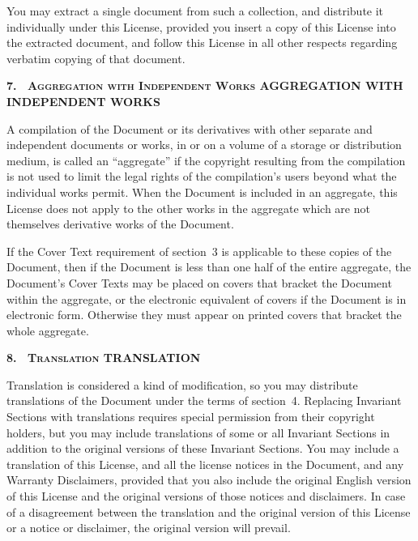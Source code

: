 You may extract a single document from such a collection,
and distribute it individually under this License, provided
you insert a copy of this License into the extracted
document, and follow this License in all other respects
regarding verbatim copying of that document.

\medskip
\begin{center}
  \textbf{%
    \Large
    7.\
    \ifgfdl@sc
      \textsc{Aggregation with Independent Works}%
    \else
      AGGREGATION WITH INDEPENDENT WORKS%
    \fi
  }%
\end{center}

\noindent
A compilation of the Document or its derivatives with other
separate and independent documents or works, in or on a
volume of a storage or distribution medium, is called an
\enquote{aggregate} if the copyright resulting from the
compilation is not used to limit the legal rights of the
compilation's users beyond what the individual works permit.
When the Document is included in an aggregate, this License
does not apply to the other works in the aggregate which are
not themselves derivative works of the Document.

If the Cover Text requirement of section~3 is applicable to
these copies of the Document, then if the Document is less
than one half of the entire aggregate, the Document's Cover
Texts may be placed on covers that bracket the Document
within the aggregate, or the electronic equivalent of covers
if the Document is in electronic form. Otherwise they must
appear on printed covers that bracket the whole aggregate.

\medskip
\begin{center}
  \textbf{%
    \Large
    8.\
    \ifgfdl@sc
      \textsc{Translation}%
    \else
      TRANSLATION%
    \fi
  }%
\end{center}

\noindent
Translation is considered a kind of modification, so you may
distribute translations of the Document under the terms of
section~4. Replacing Invariant Sections with translations
requires special permission from their copyright holders,
but you may include translations of some or all Invariant
Sections in addition to the original versions of these
Invariant Sections. You may include a translation of this
License, and all the license notices in the Document, and
any Warranty Disclaimers, provided that you also include the
original English version of this License and the original
versions of those notices and disclaimers. In case of a
disagreement between the translation and the original
version of this License or a notice or disclaimer, the
original version will prevail.

